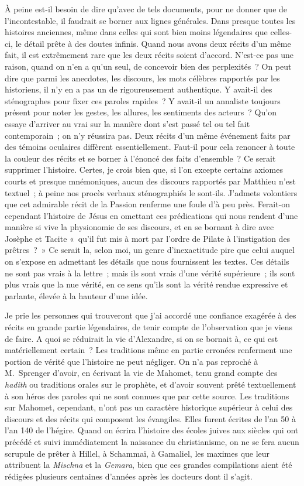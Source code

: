 \documentclass[french,twoside]{book} %
\begin{document}
À peine est-il besoin de dire qu’avec de tels documents, pour ne donner que de l’incontestable, il faudrait se borner aux lignes générales. Dans presque toutes les histoires anciennes, même dans celles qui sont bien moins légendaires que celles-ci, le détail prête à des doutes infinis. Quand nous avons deux récits d’un même fait, il est extrêmement rare que les deux récits soient d’accord. N’est-ce pas une raison, quand on n’en a qu’un seul, de concevoir bien des perplexités ? On peut dire que parmi les anecdotes, les discours, les mots célèbres rapportés par les historiens, il n’y en a pas un de rigoureusement authentique. Y avait-il des sténographes pour fixer ces paroles rapides ? Y avait-il un annaliste toujours présent pour noter les gestes, les allures, les sentiments des acteurs ? Qu’on essaye d’arriver au vrai sur la manière dont s’est passé tel ou tel fait contemporain ; on n’y réussira pas. Deux récits d’un même événement faits par des témoins oculaires diffèrent essentiellement. Faut-il pour cela renoncer à toute la couleur des récits et se borner à l’énoncé des faits d’ensemble ? Ce serait supprimer l’histoire. Certes, je crois bien que, si l’on excepte certains axiomes courts et presque mnémoniques, aucun des discours rapportés par Matthieu n’est textuel ; à peine nos procès verbaux sténographiés le sont-ils. J’admets volontiers que cet admirable récit de la Passion renferme une foule d’à peu près. Ferait-on cependant l’histoire de Jésus en omettant ces prédications qui nous rendent d’une manière si vive la physionomie de ses discours, et en se bornant à dire avec Josèphe et Tacite « qu’il fut mis à mort par l’ordre de Pilate à l’instigation des prêtres ? » Ce serait la, selon moi, un genre d’inexactitude pire que celui auquel on s’expose en admettant les détails que nous fournissent les textes. Ces détails ne sont pas vrais à la lettre ; mais ils sont vrais d’une vérité supérieure ; ils sont plus vrais que la nue vérité, en ce sens qu’ils sont la vérité rendue expressive et parlante, élevée à la hauteur d’une idée.\par
Je prie les personnes qui trouveront que j’ai accordé une confiance exagérée à des récits en grande partie légendaires, de tenir compte de l’observation que je viens de faire. A quoi se réduirait la vie d’Alexandre, si on se bornait à, ce qui est matériellement certain ? Les traditions même en partie erronées renferment une portion de vérité que l’histoire ne peut négliger. On n’a pas reproché à M. Sprenger d’avoir, en écrivant la vie de Mahomet, tenu grand compte des {\itshape hadith} ou traditions orales sur le prophète, et d’avoir souvent prêté textuellement à son héros des paroles qui ne sont connues que par cette source. Les traditions sur Mahomet, cependant, n’ont pas un caractère historique supérieur à celui des discours et des récits qui composent les évangiles. Elles furent écrites de l’an 50 à l’an 140 de l’hégire. Quand on écrira l’histoire des écoles juives aux siècles qui ont précédé et suivi immédiatement la naissance du christianisme, on ne se fera aucun scrupule de prêter à Hillel, à Schammaï, à Gamaliel, les maximes que leur attribuent la {\itshape Mischna} et la {\itshape Gemara}, bien que ces grandes compilations aient été rédigées plusieurs centaines d’années après les docteurs dont il s’agit.\par
\end{document}
